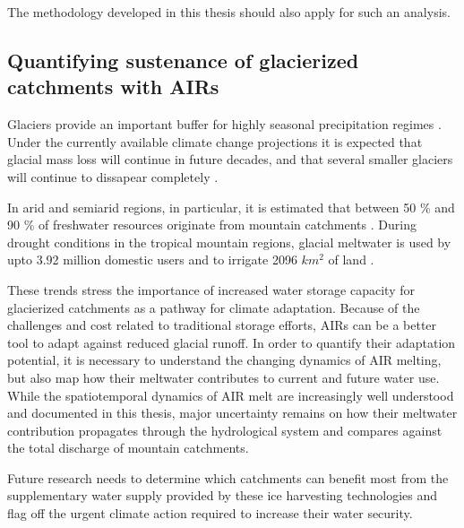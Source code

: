 The methodology developed in this thesis should also apply for such an analysis.

\subsection{Quantifying sustenance of glacierized catchments with AIRs}

Glaciers provide an important buffer for highly seasonal precipitation regimes
\citep{kaserContributionPotentialGlaciers2010}. Under the currently available climate change projections it is
expected that glacial mass loss will continue in future decades, and that several smaller glaciers will continue
to dissapear completely \citep{rabatelCurrentStateGlaciers2013}. 

In arid and semiarid regions, in particular, it is estimated that between 50 \% and 90 \% of freshwater
resources originate from mountain catchments \citep{messerliMountainsWorldVulnerable2004}. During drought
conditions in the tropical mountain regions, glacial meltwater is used by upto 3.92 million domestic users and
to irrigate 2096 $km^2$ of land \citep{buytaertGlacialMeltContent2017}.  

These trends stress the importance of increased water storage capacity for glacierized catchments as a pathway
for climate adaptation. Because of the challenges and cost related to traditional storage efforts, AIRs can be
a better tool to adapt against reduced glacial runoff. In order to quantify their adaptation potential, it
is necessary to understand the changing dynamics of AIR melting, but also map how their meltwater contributes to
current and future water use. While the spatiotemporal dynamics of AIR melt are increasingly well understood and
documented in this thesis, major uncertainty remains on how their meltwater contribution propagates through the
hydrological system and compares against the total discharge of mountain catchments. 

Future research needs to determine which catchments can benefit most from the supplementary water supply
provided by these ice harvesting technologies and flag off the urgent climate action required to increase their
water security.


